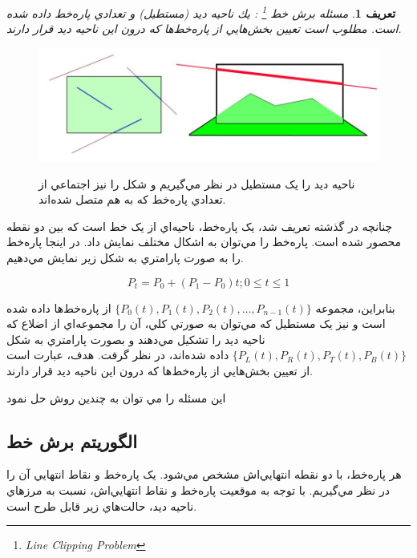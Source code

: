 \documentclass{book}
\newtheorem{defn}[section]{تعریف}
\begin{document}
\begin{defn}
    مسئله برش خط \footnote{‌Line Clipping Problem}
    : يك ناحيه ديد (مستطيل) و تعدادي پاره‌خط داده شده است. مطلوب است تعيين بخش‌هايي از پاره‌خط‌ها كه درون اين ناحيه ديد قرار دارند.
\end{defn}

\begin{figure}[h!]
    \begin{center}
        \includegraphics[width=\linewidth]{crop.jpg}
        \label{crop}
        \caption{ناحيه ديد را يک مستطيل در نظر مي‌گيريم و شکل را نيز اجتماعي از تعدادي پاره‌خط که به هم متصل شده‌اند. }
    \end{center}
\end{figure}

چنانچه در گذشته تعريف شد، يک پاره‌خط، ناحيه‌اي از يک خط است که بين دو نقطه محصور شده است. پاره‌خط را مي‌توان به اشکال مختلف نمايش داد. در اينجا پاره‌خط را به صورت پارامتري به شکل زير نمايش مي‌دهيم.

$$ P_t=P_0+(P_1-P_0)t ; 0\leq t\leq 1$$

بنابراين، مجموعه $\{P_0(t),P_1(t),P_2(t),…,P_{n-1}(t)\}$ از پاره‌خط‌ها داده شده است و نيز يک مستطيل که مي‌توان به صورتي کلي، آن را مجموعه‌اي از اضلاع که ناحيه ديد را تشکيل مي‌دهند و بصورت پارامتري به شکل $\{P_L(t),P_R(t),P_T(t),P_B(t)\}$ داده شده‌اند، در نظر گرفت. هدف، عبارت است از تعيين بخش‌هايي از پاره‌خط‌ها که درون اين ناحيه ديد قرار دارند.

اين مسئله را مي توان به چندين روش حل نمود 

\subsection{الگوريتم برش خط}

هر پاره‌خط، با دو نقطه انتهايي‌اش مشخص مي‌شود. يک پاره‌خط و نقاط انتهايي آن را در نظر مي‌گيريم. با توجه به موقعيت پاره‌خط و نقاط انتهايي‌اش، نسبت به مرزهاي ناحيه ديد، حالت‌هاي زير قابل طرح  است.
\end{document}
